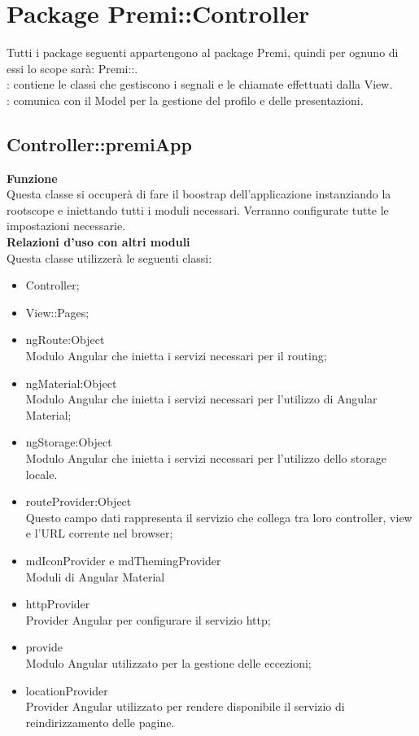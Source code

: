 \section{Package Premi::\-Controller}{
	\label{sec:controller}
	Tutti i package seguenti appartengono al package Premi, quindi per ognuno di essi lo scope sarà: Premi::.\\
	\textbf{\tipo}: contiene le classi che gestiscono i segnali e le chiamate effettuati dalla View.\\
	\textbf{\relaz}: comunica con il Model per la gestione del profilo e delle presentazioni.\\

	\subsection{Controller::\-premiApp}{
		\label{sec:premiapp}
		\textbf{Funzione}\\
		\indent Questa classe si occuperà di fare il boostrap dell'applicazione instanziando la rootscope  e iniettando tutti i moduli necessari. Verranno configurate tutte le impostazioni necessarie.\\
		\textbf{Relazioni d'uso con altri moduli}\\
		\indent Questa classe utilizzerà le seguenti classi:
		\begin{itemize}
			\item Controller;
			\item View::Pages;
			\item ngRoute:Object\\
				\indent Modulo Angular che inietta i servizi necessari per il routing;
			\item ngMaterial:Object\\
				\indent Modulo Angular che inietta i servizi necessari per l'utilizzo di Angular Material;
			\item ngStorage:Object\\
				\indent Modulo Angular che inietta i servizi necessari per l'utilizzo dello storage locale.
			\item \textdollar routeProvider:Object\\
				\indent Questo campo dati rappresenta il servizio che collega tra loro controller, view e l'URL corrente nel browser;
			\item \textdollar mdIconProvider e \textdollar mdThemingProvider\\
				\indent Moduli di Angular Material
			\item \textdollar httpProvider\\
				\indent Provider Angular per configurare il servizio http;
			\item \textdollar provide\\
				\indent Modulo Angular utilizzato per la gestione delle eccezioni;
			\item \textdollar locationProvider\\
				\indent Provider Angular utilizzato per rendere disponibile il servizio di reindirizzamento delle pagine.
		\end{itemize}
	}

}
